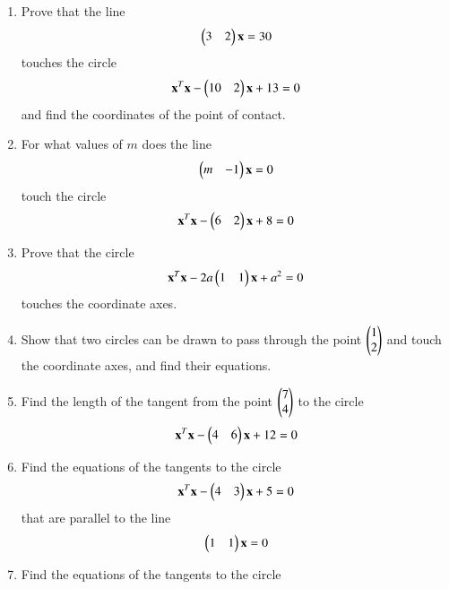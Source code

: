 \begin{enumerate}[label=\arabic*.,ref=\thesubsection.\theenumi]
\item Prove that the line 
\begin{align}
\begin{pmatrix}3 &2\end{pmatrix}\mathbf{x}=30 \label{eq:solutions/4/2/3/given_line_eq}
\end{align}
touches the circle
\begin{align}
\mathbf{x}^T\mathbf{x}-\begin{pmatrix}10 & 2\end{pmatrix}\mathbf{x}+13 = 0 \label{eq:solutions/4/2/3/given_circle_eq}
\end{align}
and find the coordinates of the point of contact.
%
\solution

\item For what values of $m$ does the line 
\begin{align}
\begin{pmatrix}m &-1\end{pmatrix}\mathbf{x}=0
\label{eq:solutions/4/2/4/1.1}
\end{align}
touch the circle
\begin{align}
\mathbf{x}^T\mathbf{x}-\begin{pmatrix}6 & 2\end{pmatrix}\mathbf{x}+8 = 0 \label{eq:solutions/4/2/4/1.2}
\end{align}
\solution

\renewcommand{\theequation}{\theenumi}
\item Prove that the circle 
\begin{align}
\mathbf{x}^T\mathbf{x}-2a\begin{pmatrix}1 & 1\end{pmatrix}\mathbf{x}+a^2 = 0
\label{eq:solutions/4/2/5/eq1}
\end{align}
touches the coordinate axes.
\solution

\item Show that two circles can be drawn to pass through the point $\begin{pmatrix}1\\2\end{pmatrix}$ and touch the coordinate axes, and find their equations.
\solution
%
\item Find the length of the tangent from the point $\begin{pmatrix}7\\4\end{pmatrix}$ to the circle 
\begin{align}
\mathbf{x}^T\mathbf{x}-\begin{pmatrix}4 & 6\end{pmatrix}\mathbf{x}+12 = 0
\end{align}
\item  Find the equations of the tangents to the circle
\begin{align}
\mathbf{x}^T\mathbf{x}-\begin{pmatrix}4 & 3\end{pmatrix}\mathbf{x}+5 = 0
\end{align}
that are parallel to the line 
\begin{align}
\begin{pmatrix}1 & 1\end{pmatrix}\mathbf{x}=0
\end{align}
\renewcommand{\theequation}{\theenumi}
\item Find the equations of the tangents to the circle
\begin{align}

\end{align}
\end{enumerate}
